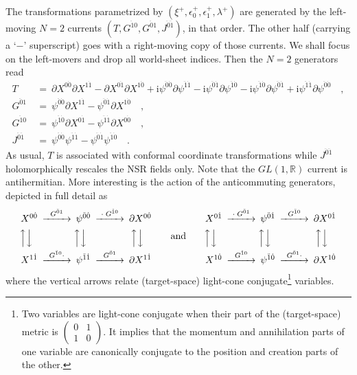 \documentclass[a4paper,11pt]{article}
\def\eps{\epsilon}
\def\l{\lambda}
\def\x{\xi}
\def\j{\psi}
\newcommand{\R}{\mathbb R}
\def\i{\textrm{i}}
\def\N2{$N{=}2$}
\def\pa{\mbox{$\partial$}}
\def\zd{{\dot{0}}}
\def\od{{\dot{1}}}
\def\zdd{{\ddot{0}}}
\def\odd{{\ddot{1}}}
\begin{document}
The transformations parametrized by
$(\x^+,\eps^+_0,\eps^+_1,\l^+)$ are generated by the left-moving \N2 currents
$(T,G^{\odd 0},G^{\zdd 1},J^{\zdd\odd})$, in that order. 
The other half (carrying a `$-$' superscript) goes with a right-moving 
copy of those currents. We shall focus on the left-movers and drop all
world-sheet indices. Then the \N2 generators read
\begin{align}
T\ &=\ \pa X^{0\zd} \pa X^{1\od} - \pa X^{0\od} \pa X^{1\zd} +
       \i\j^{\zdd\zd} \pa\j^{\odd\od} - \i\j^{\zdd\od} \pa\j^{\odd\zd} -
       \i\j^{\odd\zd} \pa\j^{\zdd\od} + \i\j^{\odd\od} \pa\j^{\zdd\zd} \quad,
\label{T} \\
G^{\zdd 1}\ &=\ \j^{\zdd\zd} \pa X^{1\od} - \j^{\zdd\od} \pa X^{1\zd} \quad,
\label{G01} \\
G^{\odd 0}\ &=\ \j^{\odd\zd} \pa X^{0\od} - \j^{\odd\od} \pa X^{0\zd} \quad,
\label{G10} \\
J^{\zdd\odd}\ &=\ \j^{\zdd\zd} \j^{\odd\od} - \j^{\zdd\od} \j^{\odd\zd} \quad.
\label{J01}
\end{align}
As usual, $T$ is associated with conformal coordinate transformations
while $J^{\zdd\odd}$ holomorphically rescales the NSR fields only.
Note that the $GL(1,\R)$ current is antihermitian.
More interesting is the action of the anticommuting generators, 
depicted in full detail as
\begin{equation} \label{cd}
\begin{CD}
X^{0\zd} @>{G^{\zdd 1}}>> \j^{\zdd\zd} @>{\cdot\;G^{\odd 0}}>> \pa X^{0\zd} \\
@V{\Big\uparrow}VV @V{\Big\uparrow}VV @V{\Big\uparrow}VV \\
X^{1\od} @>{G^{\odd 0}\cdot}>> \j^{\odd\od} @>{G^{\zdd 1}}>> \pa X^{1\od}
\end{CD}
\qquad\textrm{and}\qquad
\begin{CD}
X^{0\od} @>{\cdot\;G^{\zdd 1}}>> \j^{\zdd\od} @>{G^{\odd 0}}>> \pa X^{0\od} \\
@V{\Big\uparrow}VV @V{\Big\uparrow}VV @V{\Big\uparrow}VV \\
X^{1\zd} @>{G^{\odd 0}}>> \j^{\odd\zd} @>{G^{\zdd 1}\cdot}>> \pa X^{1\zd}
\end{CD} 
\end{equation}
where the vertical arrows relate (target-space) light-cone conjugate\footnote{
Two variables are light-cone conjugate when their part of the (target-space)
metric is $\left(\begin{smallmatrix} 0 & 1 \\ 1 & 0 \end{smallmatrix}\right)$.
It implies that the momentum and annihilation parts of one variable are 
canonically conjugate to the position and creation parts of the other.}
variables.
\\
\end{document}
